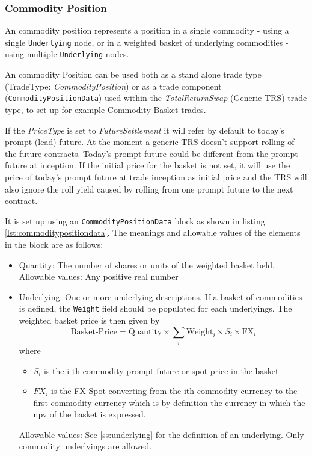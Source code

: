 \subsubsection{Commodity Position}
\label{ss:commodity_position}

An commodity position represents a position in a single commodity - using a single \lstinline!Underlying! node, or in a weighted basket of underlying commodities -  using multiple \lstinline!Underlying! nodes. 

An commodity Position can be used both as a stand alone trade type (TradeType: \emph{CommodityPosition}) or as a trade component ({\tt CommodityPositionData}) used within the \emph{TotalReturnSwap} (Generic TRS) trade type, to set up for example Commodity Basket trades.

If the \emph{PriceType} is set to \emph{FutureSettlement} it will refer by default to today's prompt (lead) future. At the moment a generic TRS doesn't support rolling of the future contracts. Today's prompt future could be different from the prompt future at inception. If the initial price for the basket is not set, it will use the price of today's prompt future at trade inception as initial price and the TRS will also ignore the roll yield caused by rolling from one prompt future to the next contract.

 It is set up using an {\tt CommodityPositionData} block as shown in listing \ref{lst:commoditypositiondata}. The meanings and allowable
values of the elements in the block are as follows:

\begin{itemize}
\item Quantity: The number of shares or units of the weighted basket held.\\
  Allowable values: Any positive real number
\item Underlying: One or more underlying descriptions. If a basket of commodities is defined, the \verb+Weight+ field
  should be populated for each underlyings. The weighted basket price is then given by\\
  $$\text{Basket-Price} = \text{Quantity} \times \sum_i \text{Weight}_i \times S_i \times \text{FX}_i$$
  where
  \begin{itemize}
  \item $S_i$ is the i-th commodity prompt future or spot price in the basket
  \item $FX_i$ is the FX Spot converting from the ith commodity currency to the first commodity currency which is by
    definition the currency in which the npv of the basket is expressed.
  \end{itemize}
  Allowable values: See \ref{ss:underlying} for the definition of an underlying. Only commodity underlyings are allowed.
\end{itemize}

